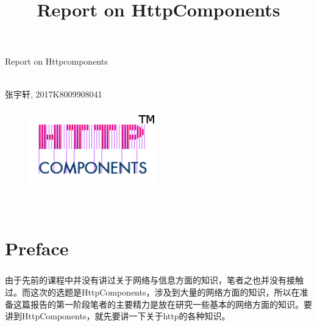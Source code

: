 \documentclass{article}
\begin{document}
	\title{Report on HttpComponents}  %
	\begin{center}
		\huge Report on Httpcomponents\\
		\hspace*{\fill} \\ %
		\begin{CJK}{UTF8}{gbsn}
			\normalsize 张宇轩, 2017K8009908041\\
		\end{CJK}{}
	\end{center}
	\begin{figure}[H]
		\centering
		\includegraphics[height = 3.5cm, width = 5.5cm]{pics/1_httpcomponents.png}	
	\end{figure}

	\hspace*{\fill} \\ %
	
	\tableofcontents{} %
	\clearpage
	\section{Preface}
	\subparagraph{}
	\begin{CJK}{UTF8}{gbsn}
		由于先前的课程中并没有讲过关于网络与信息方面的知识，笔者之也并没有接触过。而这次的选题是HttpComponents，涉及到大量的网络方面的知识，所以在准备这篇报告的第一阶段笔者的主要精力是放在研究一些基本的网络方面的知识。要讲到HttpComponents，就先要讲一下关于http的各种知识。
	\end{CJK}{}
	\clearpage
	

\end{document}
